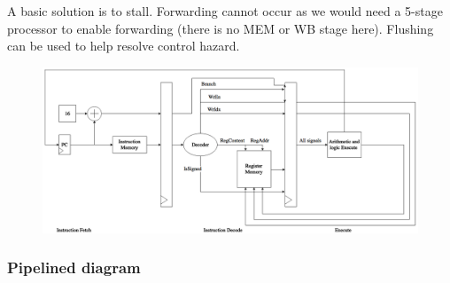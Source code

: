 \documentclass[a4paper]{report}
\begin{document}
A basic solution is to stall. Forwarding cannot occur as we would need a 5-stage processor to enable forwarding (there is no MEM or WB stage here). Flushing can be used to help resolve control hazard.

\begin{figure}
	\centering
	\includegraphics[width=25cm]{processor.png}
\end{figure}

\subsubsection{Pipelined diagram}
\end{document}
